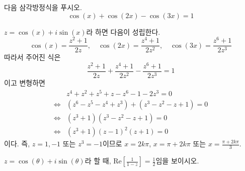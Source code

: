 \documentclass[11pt, a4paper]{book}
\begin{document}
\begin{example}
	다음 삼각방정식을 푸시오.
	\[
	\cos(x) + \cos(2x) - \cos(3x) =1
	\]
	\begin{solution}
		$z=\cos(x) +i\sin(x)$라 하면 다음이 성립한다.
		\[
		\cos(x) =\frac{z^{2}+1}{2z},\quad \cos(2x) =\frac{z^{4}+1}{2z^{2}}, \quad \cos(3x) =\frac{z^{6}+1}{2z^{3}}
		\]
		따라서 주어진 식은
		\[
		\frac{z^{2}+1}{2z}+\frac{z^{4}+1}{2z^{2}} - \frac{z^{6}+1}{2z^{3}} =1
		\]
		이고 변형하면
		\begin{align*}
			\phantom{\Leftrightarrow}&z^{4} +z^{2} +z^{5} +z -z^{6}-1 - 2z^{3} =0 \\
			\Leftrightarrow & (z^{6} - z^{5}-z^{4}+z^{3}) +(z^{3}-z^{2}-z+1)=0 \\
			\Leftrightarrow & (z^{3}+1)(z^{3}-z^{2}-z+1) =0 \\
			\Leftrightarrow & (z^{3}+1)(z-1)^{2}(z+1)=0
		\end{align*}
		이다. 즉, $z=1, -1$ 또는 $z^{3}=-1$이므로 $x=2k \pi$, $x=\pi + 2k \pi$ 또는 $x=\frac{\pi+2k \pi}{3}$.
	\end{solution}
	
\end{example}
\begin{problem}\label{prob:realpt}
	$z=\cos(\theta) + i \sin(\theta)$라 할 때, $\textrm{Re}\left[\frac{1}{1-z}\right] =\frac{1}{2}$임을 보이시오.
\end{problem}
\end{document}

